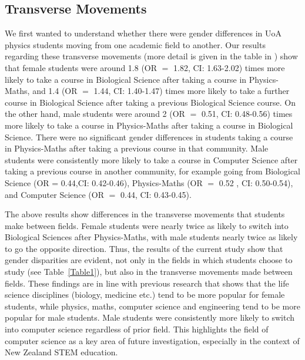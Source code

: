 \subsection*{Transverse Movements}
We first wanted to understand whether there were gender differences in UoA physics students moving from one academic field to another. Our results regarding these transverse movements (more detail is given in the table in ) show that female students were around 1.8 (OR $=$ 1.82, CI: 1.63-2.02) times more likely to take a course in Biological Science after taking a course in Physics-Maths, and 1.4 (OR $=$ 1.44, CI: 1.40-1.47) times more likely to take a further course in Biological Science after taking a previous Biological Science course. On the other hand, male students were around 2 (OR $=$ 0.51, CI: 0.48-0.56) times more likely to take a course in Physics-Maths after taking a course in Biological Science. There were no significant gender differences in students taking a course in Physics-Maths after taking a previous course in that community. Male students were consistently more likely to take a course in Computer Science after taking a previous course in another community, for example going from Biological Science (OR = 0.44,CI: 0.42-0.46), Physics-Maths (OR $=$ 0.52 , CI: 0.50-0.54), and Computer Science (OR $=$ 0.44, CI: 0.43-0.45).
 
The above results show differences in the transverse movements that students make between fields. Female students were nearly twice as likely to switch into Biological Sciences after Physics-Maths, with male students nearly twice as likely to go the opposite direction. Thus, the results of the current study show that gender disparities are evident, not only in the fields in which students choose to study (see Table~\ref{Table1}), but also in the transverse movements made between fields. These findings are in line with previous research that shows that the life science disciplines (biology, medicine etc.) tend to be more popular for female students, while physics, maths, computer science and engineering tend to be more popular for male students.\cite{NSF, Cunningham_2015,Kost_Smith_2010,Heilbronner_2012, Stevanovic_2013, InstituteofPhysics_2012, Smith_2011, EducationCounts_2016a, Kennedy_2014, Semela_2010} Male students were consistently more likely to switch into computer science regardless of prior field. This highlights the field of computer science as a key area of future investigation, especially in the context of New Zealand STEM education.

